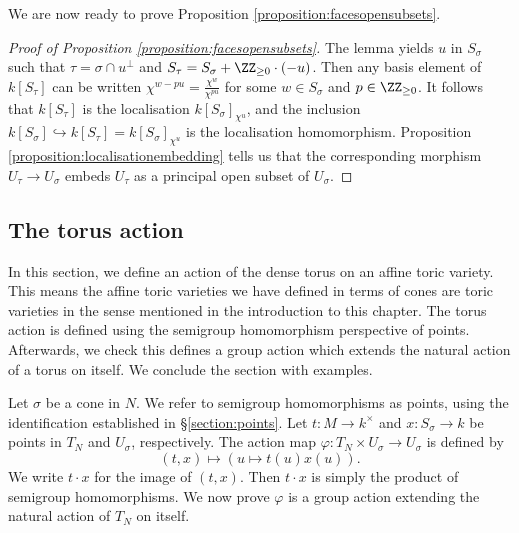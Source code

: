 \documentclass[12pt]{amsart}
\theoremstyle{plain}
\begin{document}
We are now ready to prove Proposition \ref{proposition:facesopensubsets}.

\begin{proof}[{Proof of Proposition \ref{proposition:facesopensubsets}}]
The lemma yields $u$ in $S_\sigma$ such that $\tau = \sigma \cap u^\perp$ and $S_\tau = S_\sigma + \ZZ_{\ge 0} \cdot (-u)$.
Then any basis element of $k[S_\tau]$ can be written $\chi^{w - pu} = \frac{\chi^w}{\chi^{pu}}$ for some $w \in S_\sigma$ and $p \in \ZZ_{\ge 0}$.
It follows that $k[S_\tau]$ is the localisation $k[S_\sigma]_{\chi^u}$, and the inclusion $k[S_\sigma] \hookrightarrow k[S_\tau] = k[S_\sigma]_{\chi^u}$ is the localisation homomorphism.
Proposition \ref{proposition:localisationembedding} tells us that the corresponding morphism $U_\tau \to U_\sigma$ embeds $U_\tau$ as a principal open subset of $U_\sigma$.
\end{proof}

\subsection{The torus action}\label{section:thetorusaction}
In this section, we define an action of the dense torus on an affine toric variety.
This means the affine toric varieties we have defined in terms of cones are toric varieties in the sense mentioned in the introduction to this chapter.
The torus action is defined using the semigroup homomorphism perspective of points.
Afterwards, we check this defines a group action which extends the natural action of a torus on itself.
We conclude the section with examples.

Let $\sigma$ be a cone in $N$.
We refer to semigroup homomorphisms as points, using the identification established in \S\ref{section:points}.
Let $t : M \to k^\times$ and $x : S_\sigma \to k$ be points in $T_N$ and $U_\sigma$, respectively.
The action map $\varphi : T_N \times U_\sigma \to U_\sigma$ is defined by 
$$(t, x) \mapsto (u \mapsto t(u)x(u)).$$
We write $t \cdot x$ for the image of $(t, x)$.
Then $t \cdot x$ is simply the product of semigroup homomorphisms.
We now prove $\varphi$ is a group action extending the natural action of $T_N$ on itself.
\end{document}
